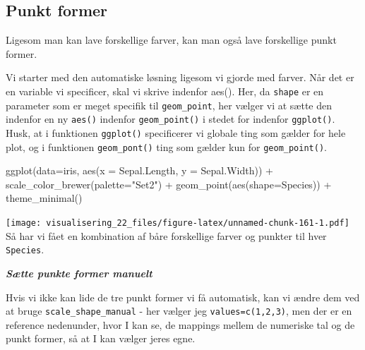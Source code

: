 \documentclass[
]{book}
\newenvironment{Shaded}{\begin{snugshade}}{\end{snugshade}}
\newcommand{\AttributeTok}[1]{\textcolor[rgb]{0.77,0.63,0.00}{#1}}
\newcommand{\FunctionTok}[1]{\textcolor[rgb]{0.00,0.00,0.00}{#1}}
\newcommand{\NormalTok}[1]{#1}
\newcommand{\SpecialCharTok}[1]{\textcolor[rgb]{0.00,0.00,0.00}{#1}}
\newcommand{\StringTok}[1]{\textcolor[rgb]{0.31,0.60,0.02}{#1}}
\begin{document}
\hypertarget{punkt-former}{%
\subsection{Punkt former}\label{punkt-former}}

Ligesom man kan lave forskellige farver, kan man også lave forskellige punkt former.

Vi starter med den automatiske løsning ligesom vi gjorde med farver. Når det er en variable vi specificer, skal vi skrive indenfor aes(). Her, da \texttt{shape} er en parameter som er meget specifik til \texttt{geom\_point}, her vælger vi at sætte den indenfor en ny \texttt{aes()} indenfor \texttt{geom\_point()} i stedet for indenfor \texttt{ggplot()}. Husk, at i funktionen \texttt{ggplot()} specificerer vi globale ting som gælder for hele plot, og i funktionen \texttt{geom\_pont()} ting som gælder kun for \texttt{geom\_point()}.

\begin{Shaded}
\begin{Highlighting}[]
\FunctionTok{ggplot}\NormalTok{(}\AttributeTok{data=}\NormalTok{iris, }\FunctionTok{aes}\NormalTok{(}\AttributeTok{x =}\NormalTok{ Sepal.Length, }\AttributeTok{y =}\NormalTok{ Sepal.Width)) }\SpecialCharTok{+}
  \FunctionTok{scale\_color\_brewer}\NormalTok{(}\AttributeTok{palette=}\StringTok{"Set2"}\NormalTok{) }\SpecialCharTok{+}
  \FunctionTok{geom\_point}\NormalTok{(}\FunctionTok{aes}\NormalTok{(}\AttributeTok{shape=}\NormalTok{Species)) }\SpecialCharTok{+} 
  \FunctionTok{theme\_minimal}\NormalTok{()}
\end{Highlighting}
\end{Shaded}

\texttt{[image: visualisering\_22\_files/figure-latex/unnamed-chunk-161-1.pdf]}
Så har vi fået en kombination af båre forskellige farver og punkter til hver \texttt{Species}.

\textbf{\emph{Sætte punkte former manuelt}}

Hvis vi ikke kan lide de tre punkt former vi få automatisk, kan vi ændre dem ved at bruge \texttt{scale\_shape\_manual} - her vælger jeg \texttt{values=c(1,2,3)}, men der er en reference nedenunder, hvor I kan se, de mappings mellem de numeriske tal og de punkt former, så at I kan vælger jeres egne.
\end{document}
